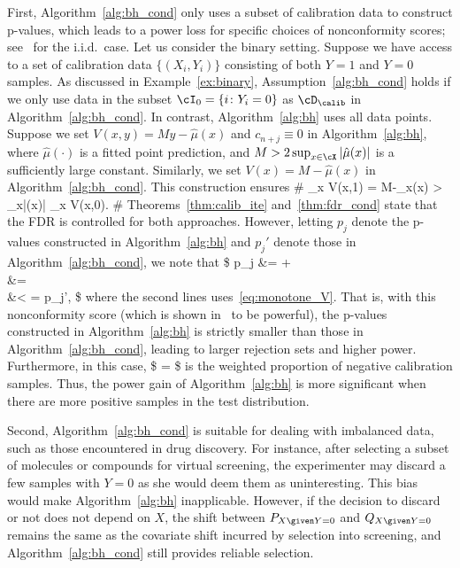 First, Algorithm~\ref{alg:bh_cond}
only uses a subset of calibration data to construct p-values,
which leads to a power loss
for specific choices of nonconformity scores;
see~\cite[Appendix A.1]{jin2022selection} for the i.i.d.~case.
%
Let us consider the binary setting.
Suppose we have access to a set of calibration data $\{(X_i,Y_i)\}$
consisting of both $Y=1$ and $Y=0$ samples.
As discussed in Example~\ref{ex:binary},
Assumption~\ref{alg:bh_cond} holds if we only use data in
the subset
$\cI_0 = \{i\colon Y_i=0\}$ as $\cD_\calib$ in Algorithm~\ref{alg:bh_cond}. In contrast,
Algorithm~\ref{alg:bh} uses all data points.
Suppose we set $V(x,y) = My - \hat\mu(x)$
and $c_{n+j} \equiv 0$ in Algorithm~\ref{alg:bh},
where  $\hat\mu(\cdot)$ is  a fitted point prediction, and
$M>2\sup_{x\in\cX}|\hat\mu(x)|$ is a sufficiently  large constant.
Similarly, we set $V(x)=M-\hat\mu(x)$ in Algorithm~\ref{alg:bh_cond}.
This construction ensures
\#\label{eq:monotone_V}
\inf_{x\in \cX} V(x,1) = M-\sup_{x\in \cX}\hat\mu(x)
> \sup_{x\in \cX}|\hat\mu(x)| \geq \sup_{x\in \cX} V(x,0).
\#
Theorems~\ref{thm:calib_ite}
and~\ref{thm:fdr_cond} state that the FDR is controlled
for both approaches.
However, letting $p_j$ denote the p-values
constructed in Algorithm~\ref{alg:bh} and $p_j'$ denote those in
Algorithm~\ref{alg:bh_cond}, we note that
\$
p_j &=
+   \\
&= \\
&<  = p_j',
\$
where the second lines uses~\eqref{eq:monotone_V}.
That is, with this   nonconformity score (which is shown
in~\cite{jin2022selection}
to be powerful), the p-values constructed in Algorithm~\ref{alg:bh}
is strictly  smaller than those in Algorithm~\ref{alg:bh_cond},
leading to larger rejection sets and higher power.
Furthermore, in this case,
\$
 = 
\$
is the weighted proportion of negative calibration samples.
Thus, the power gain of Algorithm~\ref{alg:bh} is more significant
when there are more positive samples in the test distribution.

Second, Algorithm~\ref{alg:bh_cond} is suitable for dealing with
imbalanced data, such as those encountered in drug discovery.
For instance, after selecting a subset of molecules or compounds  for virtual screening,
the experimenter may discard a few samples with $Y=0$ as she would deem them as uninteresting.
This bias would make Algorithm~\ref{alg:bh} inapplicable.
However, if the decision to discard or not
does not depend on $X$,
the  shift between $P_{X\given Y=0}$
and $Q_{X\given Y=0}$ remains the same as
the covariate shift incurred by selection into screening,
and Algorithm~\ref{alg:bh_cond} still provides reliable selection.


